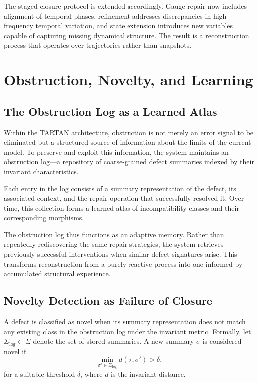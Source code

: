 \documentclass[12pt, oneside]{article}
\begin{document}
The staged closure protocol is extended accordingly. Gauge repair now includes alignment of temporal phases, refinement addresses discrepancies in high-frequency temporal variation, and state extension introduces new variables capable of capturing missing dynamical structure. The result is a reconstruction process that operates over trajectories rather than snapshots.

\section{Obstruction, Novelty, and Learning}

\subsection{The Obstruction Log as a Learned Atlas}

Within the TARTAN architecture, obstruction is not merely an error signal to be eliminated but a structured source of information about the limits of the current model. To preserve and exploit this information, the system maintains an obstruction log---a repository of coarse-grained defect summaries indexed by their invariant characteristics.

Each entry in the log consists of a summary representation of the defect, its associated context, and the repair operation that successfully resolved it. Over time, this collection forms a learned atlas of incompatibility classes and their corresponding morphisms.

The obstruction log thus functions as an adaptive memory. Rather than repeatedly rediscovering the same repair strategies, the system retrieves previously successful interventions when similar defect signatures arise. This transforms reconstruction from a purely reactive process into one informed by accumulated structural experience.

\subsection{Novelty Detection as Failure of Closure}

A defect is classified as novel when its summary representation does not match any existing class in the obstruction log under the invariant metric. Formally, let $\Sigma_{\text{log}} \subset \Sigma$ denote the set of stored summaries. A new summary $\sigma$ is considered novel if
\[
\min_{\sigma' \in \Sigma_{\text{log}}} d(\sigma, \sigma') > \delta,
\]
for a suitable threshold $\delta$, where $d$ is the invariant distance.
\end{document}
